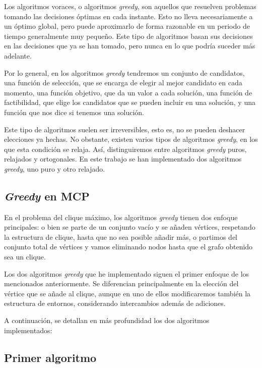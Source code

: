Los algoritmos voraces, o algoritmos \textit{greedy}, son aquellos que resuelven problemas tomando
las decisiones óptimas en cada instante. Esto no lleva necesariamente a un óptimo global, pero puede
aproximarlo de forma razonable en un periodo de tiempo generalmente muy pequeño. Este tipo de algoritmos
basan sus decisiones en las decisiones que ya se han tomado, pero nunca en lo que podría suceder más
adelante.

Por lo general, en los algoritmos \textit{greedy} tendremos un conjunto de candidatos, una función
de selección, que se encarga de elegir al mejor candidato en cada momento, una función objetivo, que
da un valor a cada solución, una función de factibilidad, que elige los candidatos que se pueden incluir
en una solución, y una función que nos dice si tenemos una solución.

Este tipo de algoritmos suelen ser irreversibles, esto es, no se pueden deshacer elecciones ya hechas.
No obstante, existen varios tipos de algoritmos \textit{greedy}, en los que esta condición se relaja. Así,
distinguiremos entre algoritmos \textit{greedy} puros, relajados y ortogonales. En este trabajo se han
implementado dos algoritmos \textit{greedy}, uno puro y otro relajado.

\subsection{\textit{Greedy} en MCP}

En el problema del clique máximo, los algoritmos \textit{greedy} tienen dos enfoque principales:
o bien se parte de un conjunto vacío y se añaden vértices, respetando la estructura de clique,
hasta que no sea posible añadir más, o partimos del conjunto total de vértices y vamos eliminando
nodos hasta que el grafo obtenido sea un clique.

Los dos algoritmos \textit{greedy} que he implementado siguen el primer enfoque de los
mencionados anteriormente. Se diferencian principalmente en la elección del vértice que
se añade al clique, aunque en uno de ellos modificaremos también la estructura de entornos,
considerando intercambios además de adiciones.

A continuación, se detallan en más profundidad los dos algoritmos implementados:

\subsection{Primer algoritmo}

